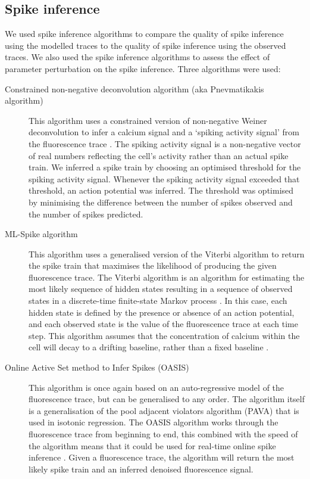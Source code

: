 \subsection{Spike inference}
We used spike inference algorithms to compare the quality of spike inference using the modelled traces to the quality of spike inference using the observed traces. We also used the spike inference algorithms to assess the effect of parameter perturbation on the spike inference. Three algorithms were used:
\begin{description}
    \item[Constrained non-negative deconvolution algorithm (aka Pnevmatikakis algorithm)] This algorithm uses a constrained version of non-negative Weiner deconvolution to infer a calcium signal and a `spiking activity signal' from the fluorescence trace  \parencite{vogelstein, pnevmatikakis}. The spiking activity signal is a non-negative vector of real numbers reflecting the cell's activity rather than an actual spike train. We inferred a spike train by choosing an optimised threshold for the spiking activity signal. Whenever the spiking activity signal exceeded that threshold, an action potential was inferred. The threshold was optimised by minimising the difference between the number of spikes observed and the number of spikes predicted.
    \item[ML-Spike algorithm] This algorithm uses a generalised version of the Viterbi algorithm to return the spike train that maximises the likelihood of producing the given fluorescence trace. The Viterbi algorithm is an algorithm for estimating the most likely sequence of hidden states resulting in a sequence of observed states in a discrete-time finite-state Markov process  \parencite{forney}. In this case, each hidden state is defined by the presence or absence of an action potential, and each observed state is the value of the fluorescence trace at each time step. This algorithm assumes that the concentration of calcium within the cell will decay to a drifting baseline, rather than a fixed baseline  \parencite{deneux}.
    \item[Online Active Set method to Infer Spikes (OASIS)] This algorithm is once again based on an auto-regressive model of the fluorescence trace, but can be generalised to any order. The algorithm itself is a generalisation of the pool adjacent violators algorithm (PAVA) that is used in isotonic regression. The OASIS algorithm works through the fluorescence trace from beginning to end, this combined with the speed of the algorithm means that it could be used for real-time online spike inference  \parencite{friedrich}. Given a fluorescence trace, the algorithm will return the most likely spike train and an inferred denoised fluorescence signal.
\end{description}
